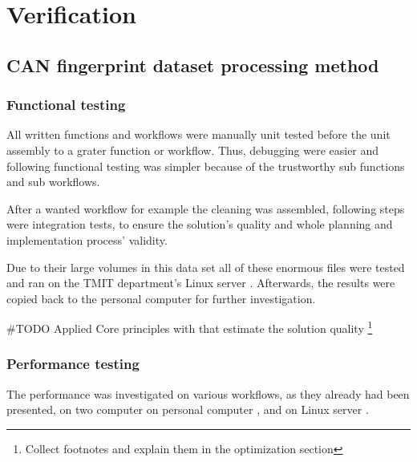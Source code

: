 \chapter{Verification}
\section{CAN fingerprint dataset processing method}
\subsection{Functional testing}
All written functions and workflows were manually unit tested before the unit assembly to a grater function or workflow. Thus, debugging were easier and following functional testing was simpler because of the trustworthy sub functions and sub workflows.

After a wanted workflow for example the cleaning was assembled, following steps were integration tests, to ensure the solution's quality and whole planning and implementation process' validity.

Due to their large volumes in this data set all of these enormous files were tested and ran on the TMIT department's Linux server \cite{Batman}.
Afterwards, the results were copied back to the personal computer for further investigation.

\#TODO Applied Core principles with that estimate the solution quality
\footnote{Collect footnotes and explain them in the optimization section}
\subsection{Performance testing}
The performance was investigated on various workflows, as they already had been presented, on two computer on personal computer \cite{Latitude}, and on Linux server \cite{Batman}.

